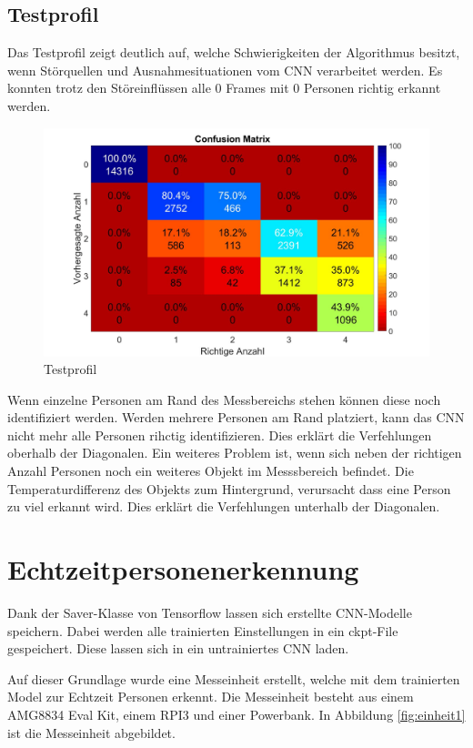 \subsection{Testprofil}
\label{subsec:Testprofil}
Das Testprofil zeigt deutlich auf, welche Schwierigkeiten der Algorithmus besitzt, wenn Störquellen und Ausnahmesituationen vom \ac{CNN} verarbeitet werden. Es konnten trotz den Störeinflüssen alle 0 Frames mit 0 Personen richtig erkannt werden. 
 
\begin{figure}[H]
	\centering
	\includegraphics[width=0.5\linewidth]{fig/Testprofilm}
	\caption{Testprofil}
	\label{fig:profil4}
\end{figure}

Wenn einzelne Personen am Rand des Messbereichs stehen können diese noch identifiziert werden. Werden mehrere Personen am Rand platziert, kann das \ac{CNN} nicht mehr alle Personen rihctig identifizieren. Dies erklärt die Verfehlungen oberhalb der Diagonalen.
Ein weiteres Problem ist, wenn sich neben der richtigen Anzahl Personen noch ein weiteres Objekt im Messsbereich befindet. Die Temperaturdifferenz des Objekts zum Hintergrund, verursacht dass eine Person zu viel erkannt wird. Dies erklärt die Verfehlungen unterhalb der Diagonalen. 

\newpage

\section{Echtzeitpersonenerkennung}
\label{sec:Echtzeitpersonenerkennung}
Dank der Saver-Klasse von Tensorflow lassen sich erstellte \ac{CNN}-Modelle speichern. Dabei werden alle trainierten Einstellungen in ein ckpt-File gespeichert. Diese lassen sich in ein untrainiertes \ac{CNN} laden.

Auf dieser Grundlage wurde eine Messeinheit erstellt, welche mit dem trainierten Model zur Echtzeit Personen erkennt. Die Messeinheit besteht aus einem AMG8834 Eval Kit, einem \ac{RPI3} und einer Powerbank. 
In Abbildung \ref{fig:einheit1} ist die Messeinheit abgebildet. 


